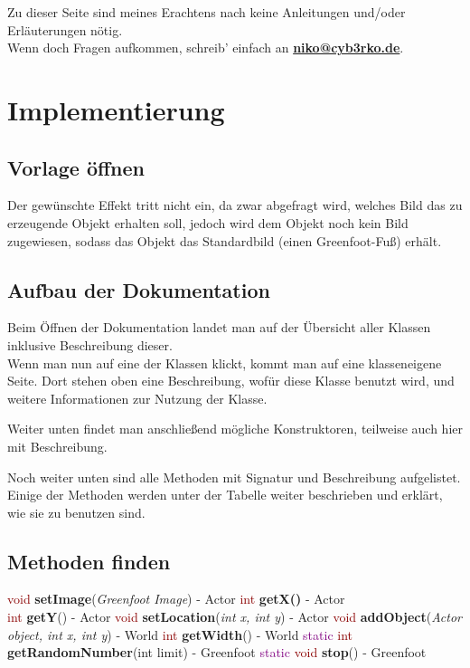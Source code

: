 \documentclass{scrartcl}   %
\begin{document}
Zu dieser Seite sind meines Erachtens nach keine Anleitungen und/oder Erläuterungen nötig.\\
Wenn doch Fragen aufkommen, schreib' einfach an \textbf{\href{mailto:niko@cyb3rko.de}{niko@cyb3rko.de}}.

\newpage

\section{Implementierung}

\subsection{Vorlage öffnen}

Der gewünschte Effekt tritt nicht ein, da zwar abgefragt wird, welches Bild das zu erzeugende Objekt erhalten soll, jedoch wird dem Objekt noch kein Bild zugewiesen, sodass das Objekt das Standardbild (einen Greenfoot-Fuß) erhält.

\subsection{Aufbau der Dokumentation}

Beim Öffnen der Dokumentation landet man auf der Übersicht aller Klassen inklusive Beschreibung dieser.\\
Wenn man nun auf eine der Klassen klickt, kommt man auf eine klasseneigene Seite. Dort stehen oben eine Beschreibung, wofür diese Klasse benutzt wird, und weitere Informationen zur Nutzung der Klasse.

Weiter unten findet man anschließend mögliche Konstruktoren, teilweise auch hier mit Beschreibung.

Noch weiter unten sind alle Methoden mit Signatur und Beschreibung aufgelistet. Einige der Methoden werden unter der Tabelle weiter beschrieben und erklärt, wie sie zu benutzen sind.

\subsection{Methoden finden}

\begin{itemize}
    \barrow \textcolor{darkred}{void} \textbf{setImage}(\textit{Greenfoot Image}) - Actor
    \barrow \textcolor{darkred}{int} \textbf{getX()} - Actor\\
    \textcolor{darkred}{int} \textbf{getY}() - Actor
    \barrow \textcolor{darkred}{void} \textbf{setLocation}(\textit{int x, int y}) - Actor
    \barrow \textcolor{darkred}{void} \textbf{addObject}(\textit{Actor object, int x, int y}) - World
    \barrow \textcolor{darkred}{int} \textbf{getWidth}() - World
    \barrow \textcolor{purple}{static} \textcolor{darkred}{int} \textbf{getRandomNumber}(int limit) - Greenfoot
    \barrow \textcolor{purple}{static} \textcolor{darkred}{void} \textbf{stop}() - Greenfoot
\end{itemize}
\end{document}
